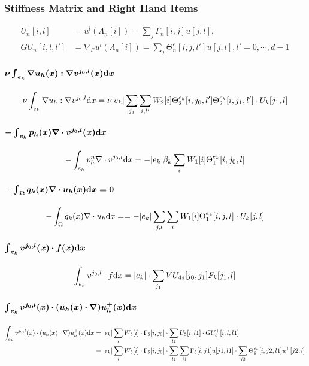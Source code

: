 \newpage
\subsubsection{Stiffness Matrix and Right Hand Items}
\[
  \begin{split}
        U_n[i,l] &= u^l(\Lambda_n[i])=\sum_j \Gamma_n[i,j]u[j,l], \\
    GU_n[i,l,l'] &= \nabla_{l'} u^l(\Lambda_n[i])=\sum_j \Theta_n^e[i,j,l']u[j,l],
    l'=0,\cdots,d-1
  \end{split}
\]
\paragraph{$\bm{\nu\int_{e_k}\nabla u_h(x):\nabla v^{j_0,l}(x)\mathrm{d} x}$} 
\[
    \nu\int_{e_k} \nabla u_h:\nabla v^{j_0,l}\mathrm{d} x = \nu|e_k| \sum_{j_1} 
    \sum_{i,l'}W_2[i]\Theta_2^{e_k}[i,j_0,l']\Theta_2^{e_k}[i,j_1,l'] 
    \cdot U_k[j_1,l]
\]
\paragraph{$\bm{-\int_{e_k}p_h(x)\nabla\cdot v^{j_0,l}(x)\mathrm{d} x}$}
\[
    -\int_{e_k} p_h^n\nabla\cdot v^{j_0,l}\mathrm{d} x
    = -|e_k| \beta_k\sum_i W_1[i] \Theta_1^{e_k}[i,j_0,l]
\]
\paragraph{$\bm{-\int_{\Omega}q_k(x)\nabla\cdot u_h(x)\mathrm{d} x=0}$}
\[
    -\int_\Omega q_k(x)\nabla\cdot u_h\mathrm{d} x =
    = -|e_k| \sum_{j,l}\sum_i W_1[i] \Theta_1^{e_k}[i,j,l] \cdot U_k[j,l]
\]


\paragraph{$\bm{\int_{e_k}v^{j_0,l}(x)\cdot f(x)\mathrm{d} x}$}
\[
  \int_{e_k}v^{j_0,l}\cdot f\mathrm{d} x = |e_k|\cdot \sum_{j_1}VU_{4s}[j_0,j_1]F_k[j_1,l]
\]

\paragraph{$\bm{\int_{e_k}v^{j_0,l}(x)\cdot(u_h(x)\cdot\nabla)
u_h^+(x)\mathrm{d} x}$}
\[
  \begin{split}
    \int_{e_k} v^{j_0,l}(x)\cdot(u_h(x)\cdot\nabla)u_h^+(x)\mathrm{d} x
    &= |e_k|\sum_iW_5[i]\cdot\Gamma_5[i,j_0]\cdot
    \sum_{l1}U_5[i,l1]\cdot GU_5^+[i,l,l1] \\
    &= |e_k|\sum_iW_5[i]\cdot\Gamma_5[i,j_0]\cdot
    \sum_{l1} \sum_{j1}\Gamma_5[i,j1] u[j1,l1] \cdot \sum_{j2}\Theta_5^{e_k}[i,j2,l1]u^+[j2,l]
  \end{split}
\]

